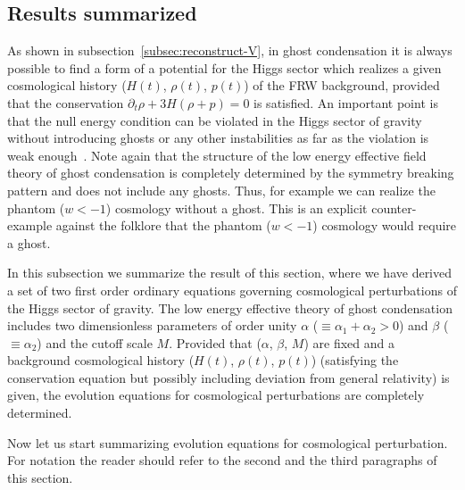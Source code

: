 \subsection{Results summarized}
\label{subsec:results-perturbation}


As shown in subsection~\ref{subsec:reconstruct-V}, in ghost condensation
it is always possible to find a form of a potential for the Higgs sector 
which realizes a given cosmological history ($H(t)$, $\rho(t)$,
$p(t)$) of the FRW background, provided that the conservation
$\partial_t\rho+3H(\rho+p)=0$ is satisfied. An important point is that
the null energy condition can be violated in the Higgs sector of gravity
without introducing ghosts or any other instabilities as far as the
violation is weak enough~\cite{Creminelli:2006xe}. Note again that the
structure of the low energy effective field theory of ghost condensation
is completely determined by the symmetry breaking pattern and does not
include any ghosts. Thus, for example we can realize the phantom
($w<-1$) cosmology without a ghost. This is an explicit counter-example
against the folklore that the phantom ($w<-1$) cosmology would require a
ghost. 


In this subsection we summarize the result of this section, where we
have derived a set of two first order ordinary equations governing
cosmological perturbations of the Higgs sector of gravity. The low
energy effective theory of ghost condensation includes two dimensionless 
parameters of order unity $\alpha$ ($\equiv\alpha_1+\alpha_2>0$) and
$\beta$ ($\equiv\alpha_2$) and the cutoff scale $M$. Provided that
($\alpha$, $\beta$, $M$) are fixed and a background cosmological history
($H(t)$, $\rho(t)$, $p(t)$) (satisfying the conservation equation but
possibly including deviation from general relativity) is given, the
evolution equations for cosmological perturbations are completely
determined. 


Now let us start summarizing evolution equations for cosmological
perturbation. For notation the reader should refer to the second and
the third paragraphs of this section. 



